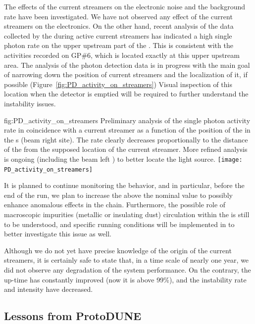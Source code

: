 The effects of the current streamers on the  electronic noise and the  background rate have been investigated. We have not observed any effect of the current streamers on the  electronics. On the other hand, recent analysis of the data collected by the  during active current streamers has indicated a high single photon rate on the upper upstream part of the . This is consistent with the activities recorded on GP\#6, which is located exactly at this upper upstream area. The analysis of the photon detection data is in progress with the main goal of narrowing down the position of current streamers and the localization of it, if possible (Figure~\ref{fig:PD_activity_on_streamers})
Visual inspection of this location when the detector is emptied will be required to further understand the  instability issues.

\begin{dunefigure}
{fig:PD_activity_on_streamers}
{Preliminary analysis of the single photon activity rate in coincidence with a current streamer as a function of the position of the  in the s (beam right site). The rate clearly decreases proportionally to the distance of the  from the supposed location of the current streamer. More refined analysis is ongoing (including the beam left ) to better locate the light source.}
\texttt{[image: PD\_activity\_on\_streamers]}
\end{dunefigure}

It is planned to continue monitoring the  behavior, and in particular, before the end of the run, we plan to increase the  above the nominal value to possibly enhance anomalous effects in the  chain. Furthermore, the possible role of macroscopic impurities (metallic or insulating dust) circulation within the  is still to be understood, and specific running conditions will be implemented in  to better investigate this issue as well. 

Although %
we do not yet have %
precise knowledge of the origin of the current streamers, it is certainly safe to state that, in a time scale of nearly one year, we did not observe any degradation of the  system performance. On the contrary, the up-time has constantly improved (now it is above 99\%), and the instability rate and intensity have decreased. 

\subsection{Lessons from ProtoDUNE}
\label{sec:fdsp-hv-protodune-lessons}

